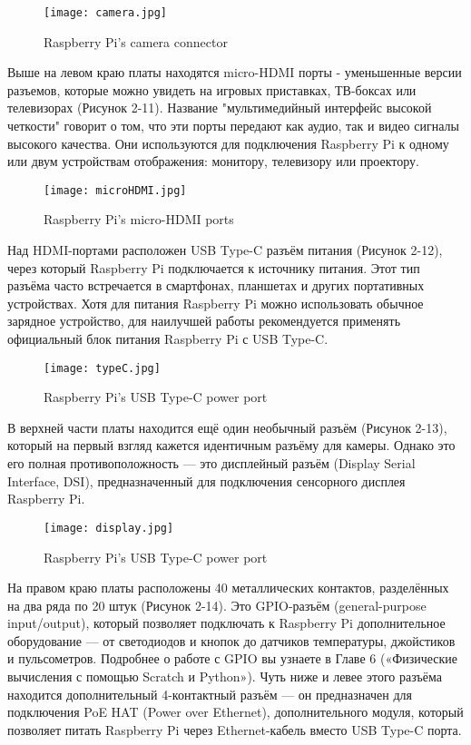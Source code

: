 \begin{figure}[H]
	\centering
	\texttt{[image: camera.jpg]}
	\caption{Raspberry Pi’s camera connector}
\end{figure}

Выше на левом краю платы находятся micro-HDMI порты - уменьшенные версии разъемов, которые можно увидеть на игровых приставках, ТВ-боксах или телевизорах (Рисунок 2-11). Название "мультимедийный интерфейс высокой четкости" говорит о том, что эти порты передают как аудио, так и видео сигналы высокого качества. Они используются для подключения Raspberry Pi к одному или двум устройствам отображения: монитору, телевизору или проектору.

\begin{figure}[H]
	\centering
	\texttt{[image: microHDMI.jpg]}
	\caption{Raspberry Pi’s micro-HDMI ports}
\end{figure}

Над HDMI-портами расположен USB Type-C разъём питания (Рисунок 2-12), через который Raspberry Pi подключается к источнику питания. Этот тип разъёма часто встречается в смартфонах, планшетах и других портативных устройствах. Хотя для питания Raspberry Pi можно использовать обычное зарядное устройство, для наилучшей работы рекомендуется применять официальный блок питания Raspberry Pi с USB Type-C.

\begin{figure}[H]
	\centering
	\texttt{[image: typeC.jpg]}
	\caption{Raspberry Pi’s USB Type-C power port}
\end{figure}

В верхней части платы находится ещё один необычный разъём (Рисунок 2-13), который на первый взгляд кажется идентичным разъёму для камеры. Однако это его полная противоположность — это дисплейный разъём (Display Serial Interface, DSI), предназначенный для подключения сенсорного дисплея Raspberry Pi.

\begin{figure}[H]
	\centering
	\texttt{[image: display.jpg]}
	\caption{Raspberry Pi’s USB Type-C power port}
\end{figure}

На правом краю платы расположены 40 металлических контактов, разделённых на два ряда по 20 штук (Рисунок 2-14). Это GPIO-разъём (general-purpose input/output), который позволяет подключать к Raspberry Pi дополнительное оборудование — от светодиодов и кнопок до датчиков температуры, джойстиков и пульсометров. Подробнее о работе с GPIO вы узнаете в Главе 6 («Физические вычисления с помощью Scratch и Python»).
Чуть ниже и левее этого разъёма находится дополнительный 4-контактный разъём — он предназначен для подключения PoE HAT (Power over Ethernet), дополнительного модуля, который позволяет питать Raspberry Pi через Ethernet-кабель вместо USB Type-C порта.

